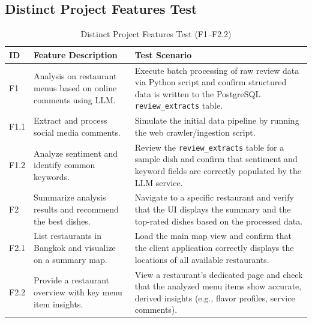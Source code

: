 \subsection{Distinct Project Features Test}
\begin{table}[H]
	\centering
	\caption{Distinct Project Features Test (F1--F2.2)}
	\label{tab:distinct-features-test}
	{\small\setlength{\tabcolsep}{4pt}
	\begin{tabularx}{\textwidth}{@{}l p{} >{\raggedright\arraybackslash}X@{}}
		\toprule
		\textbf{ID} & \textbf{Feature Description} & \textbf{Test Scenario} \\
		\midrule
		F1 & Analysis on restaurant menus based on online comments using LLM. & Execute batch processing of raw review data via Python script and confirm structured data is written to the PostgreSQL \texttt{review\_extracts} table. \\
		F1.1 & Extract and process social media comments. & Simulate the initial data pipeline by running the web crawler/ingestion script. \\
		F1.2 & Analyze sentiment and identify common keywords. & Review the \texttt{review\_extracts} table for a sample dish and confirm that sentiment and keyword fields are correctly populated by the LLM service. \\
		F2 & Summarize analysis results and recommend the best dishes. & Navigate to a specific restaurant and verify that the UI displays the summary and the top-rated dishes based on the processed data. \\
		F2.1 & List restaurants in Bangkok and visualize on a summary map. & Load the main map view and confirm that the client application correctly displays the locations of all available restaurants. \\
		F2.2 & Provide a restaurant overview with key menu item insights. & View a restaurant's dedicated page and check that the analyzed menu items show accurate, derived insights (e.g., flavor profiles, service comments). \\
		\bottomrule
	\end{tabularx}}
\end{table}

